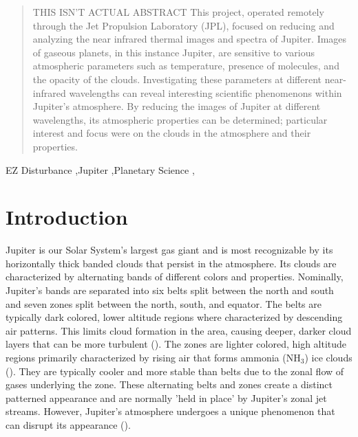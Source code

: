 \documentclass[a4paper,fleqn]{cas-dc}
\begin{document}

\fntext[1]{}


\begin{abstract}
THIS ISN'T ACTUAL ABSTRACT
This project, operated remotely through the Jet Propulsion Laboratory (JPL), focused on reducing and analyzing the near infrared thermal images and spectra of Jupiter. Images of gaseous planets, in this instance Jupiter, are sensitive to various atmospheric parameters such as temperature, presence of molecules, and the opacity of the clouds. Investigating these parameters at different near-infrared wavelengths can reveal interesting scientific phenomenons within Jupiter’s atmosphere. By reducing the images of Jupiter at different wavelengths, its atmospheric properties can be determined; particular interest and focus were on the clouds in the atmosphere and their properties.

\end{abstract}

\begin{highlights}
\item 
\item 
\item 
\end{highlights}



\begin{keywords}
EZ Disturbance \sep Jupiter \sep Planetary Science \sep
\end{keywords}

\maketitle


\section{Introduction}
Jupiter is our Solar System’s largest gas giant and is most recognizable by its horizontally thick banded clouds that persist in the atmosphere. Its clouds are characterized by alternating bands of different colors and properties. Nominally, Jupiter's bands are separated into six belts split between the north and south and seven zones split between the north, south, and equator. The belts are typically dark colored, lower altitude regions where characterized by descending air patterns. This limits cloud formation in the area, causing deeper, darker cloud layers that can be more turbulent (\cite{bagenal2006jupiter}). The zones are lighter colored, high altitude regions primarily characterized by rising air that forms ammonia (NH$_3$) ice clouds (\cite{bagenal2006jupiter}). They are typically cooler and more stable than belts due to the zonal flow of gases underlying the zone. These alternating belts and zones create a distinct patterned appearance and are normally 'held in place' by Jupiter's zonal jet streams. However, Jupiter's atmosphere undergoes a unique phenomenon that can disrupt its appearance (\cite{bagenal2006jupiter}). 
\end{document}
